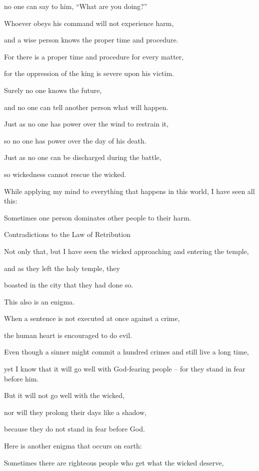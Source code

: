 {\par }{\Q no one
can say
to him, “What
are you doing?”
\par }{\Q {}Whoever
obeys
his command will not
experience
harm,
\par }{\Q and a wise
person knows
the proper
time
and procedure.
\par }{\Q {}For
there is a proper time
and procedure
for
every
matter,
\par }{\Q for the oppression
of the king
is severe
upon his victim.
\par }{\Q {}Surely
no
one knows
the future,
\par }{\Q and no one can
tell
another person what
will happen.
\par }{\Q {}Just as no
one
has power
over the wind
to restrain
it,
\par }{\Q so no one
has power
over the day
of his death.
\par }{\Q Just as no one
can be discharged
during the battle,
\par }{\Q so wickedness
cannot
rescue
the wicked.
\par }{\Q {}While applying
my mind
to everything
that
happens in this world,
I have seen
all
this:
\par }{\Q Sometimes
one person
dominates
other people
to their harm.
\par }{\SH Contradictions to the Law of Retribution
\par }{\Q {}Not only that, but I have seen
the wicked
approaching
and entering
the temple,
\par }{\Q and as they left
the holy temple,
they
\par }{\Q boasted
in the city
that
they had done
so.
\par }{\Q This
also
is an enigma.
\par }{\Q {}When a sentence
is not
executed at once against a crime,
\par }{\Q the human
heart
is encouraged to do
evil.
\par }{\Q {}Even though
a sinner
might commit
a hundred
crimes
and still live a long time,
\par }{\Q yet I
know
that
it will go
well
with God-fearing people – for they stand in fear before him.
\par }{\Q {}But it will not
go
well
with the wicked,
\par }{\Q nor
will they prolong
their days
like a shadow,
\par }{\Q because
they do not
stand in fear
before
God.
\par }{\Q {}Here is another
enigma
that
occurs
on
earth:
\par }{\Q Sometimes
there are righteous
people who
get
what
the wicked
deserve,

}
